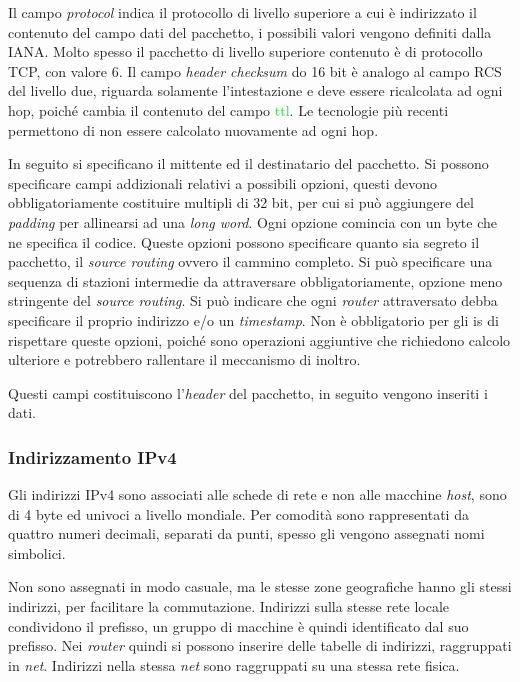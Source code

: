 \documentclass{article}
\numberwithin{equation}{subsection}
\begin{document}
Il campo \textit{protocol} indica il protocollo di livello superiore a cui è indirizzato il contenuto del campo dati del pacchetto, i possibili valori vengono definiti dalla IANA. Molto 
spesso il pacchetto di livello superiore contenuto è di protocollo \textcolor{Bittersweet}{TCP}, con valore 6. 
Il campo \textit{\textit{header} checksum} do 16 bit è analogo al campo RCS del livello due, riguarda solamente l'intestazione e deve essere ricalcolata ad ogni hop, poiché cambia il contenuto del campo \textcolor{LimeGreen}{ttl}. Le tecnologie più recenti permettono di non essere calcolato nuovamente ad ogni hop.

In seguito si specificano il mittente ed il destinatario del pacchetto. Si possono specificare campi addizionali relativi a possibili opzioni, questi devono obbligatoriamente costituire multipli di 32 bit, per cui si può aggiungere del \textit{padding} per allinearsi ad una \textit{long word}. 
Ogni opzione comincia con un byte che ne specifica il codice. Queste opzioni possono specificare quanto sia segreto il pacchetto, il \textit{source routing} ovvero il cammino completo. Si può specificare una sequenza di stazioni intermedie da attraversare obbligatoriamente, opzione meno stringente del \textit{source routing}. Si può indicare che ogni \textit{router} attraversato debba specificare il proprio indirizzo e/o un \textit{timestamp}. Non è obbligatorio per gli \textcolor{Emerald}{is} di rispettare queste opzioni, poiché sono 
operazioni aggiuntive che richiedono calcolo ulteriore e potrebbero rallentare il meccanismo di inoltro. 

Questi campi costituiscono l'\textit{header} del pacchetto, in seguito vengono inseriti i dati.  

\subsubsection{Indirizzamento \textcolor{BurntOrange}{IPv4}}

Gli indirizzi \textcolor{BurntOrange}{IPv4} sono associati alle schede di rete e non alle macchine \textit{host}, sono di 4 byte ed univoci a livello mondiale. Per comodità 
sono rappresentati da quattro numeri decimali, separati da punti, spesso gli vengono assegnati nomi simbolici. 

Non sono assegnati in modo casuale, ma le stesse zone geografiche hanno gli stessi indirizzi, per facilitare la commutazione. Indirizzi sulla stesse rete locale condividono il prefisso, un gruppo 
di macchine è quindi identificato dal suo prefisso. Nei \textit{router} quindi si 
possono inserire delle tabelle di indirizzi, raggruppati in \textit{net}. Indirizzi nella stessa \textit{net} sono raggruppati su una stessa rete fisica. 
\end{document}
